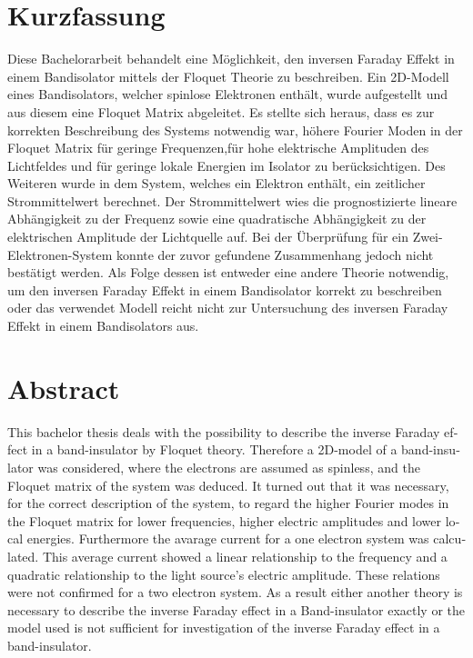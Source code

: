 \thispagestyle{plain}

\section*{Kurzfassung}
Diese Bachelorarbeit behandelt eine Möglichkeit,
den inversen Faraday Effekt
in einem Bandisolator
mittels der Floquet Theorie zu beschreiben.
Ein 2D-Modell eines Bandisolators,
welcher spinlose Elektronen enthält,
wurde aufgestellt und aus diesem
eine Floquet Matrix abgeleitet.
Es stellte sich heraus, dass es zur
korrekten Beschreibung des Systems
notwendig war, höhere Fourier Moden
in der Floquet Matrix
für geringe Frequenzen,für hohe
elektrische Amplituden des Lichtfeldes
und für geringe lokale Energien
im Isolator
 zu berücksichtigen.
Des Weiteren wurde in dem System, welches
ein Elektron enthält, ein zeitlicher Strommittelwert
berechnet. Der Strommittelwert wies
die prognostizierte
lineare Abhängigkeit
zu der Frequenz sowie eine quadratische Abhängigkeit
zu der elektrischen Amplitude der Lichtquelle auf.
Bei der Überprüfung für ein Zwei-Elektronen-System
konnte der zuvor gefundene Zusammenhang
jedoch nicht bestätigt werden.
Als Folge dessen
ist entweder eine andere Theorie notwendig,
um den inversen Faraday Effekt
in einem Bandisolator korrekt zu beschreiben
oder das verwendet Modell reicht nicht zur Untersuchung
des inversen Faraday Effekt in einem Bandisolators aus.

\section*{Abstract}
\begin{english}
This bachelor thesis deals with
 the possibility to describe
the inverse Faraday effect
in a band-insulator by Floquet theory.
Therefore a 2D-model of a band-insulator was considered,
where the electrons are assumed as spinless,
and the Floquet matrix of the system
was deduced.
It turned out that it was necessary, for the
correct description of the system, to regard the
higher Fourier modes in the Floquet
matrix for lower frequencies, higher
electric amplitudes
and lower local energies. Furthermore the
avarage current for a one electron system was calculated.
This average current showed a linear relationship to the
frequency and a quadratic relationship
to the light source's electric amplitude.
These relations were not
confirmed for a two
electron system.
As a result either another theory
is necessary to describe
the inverse Faraday effect
in a Band-insulator exactly or the model used
is not sufficient for investigation of the inverse Faraday effect in a band-insulator.
\end{english}
